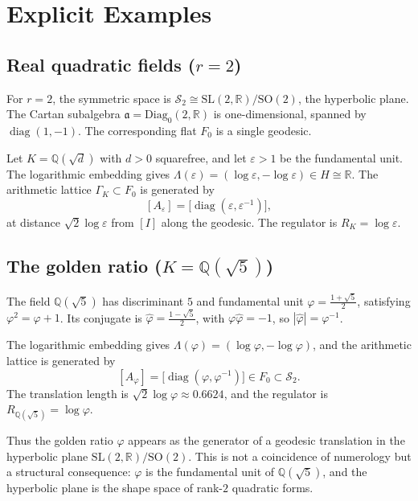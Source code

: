 \documentclass[12pt]{article}
\theoremstyle{definition}
\theoremstyle{remark}
\newcommand{\R}{\mathbb{R}}
\newcommand{\Q}{\mathbb{Q}}
\newcommand{\SL}{\mathrm{SL}}
\newcommand{\SO}{\mathrm{SO}}
\newcommand{\Diagz}{\mathrm{Diag}_{0}}
\newcommand{\calM}{\mathcal{S}}
\newcommand{\diag}{\operatorname{diag}}
\begin{document}
\section{Explicit Examples}
\label{sec:examples}

\subsection{Real quadratic fields ($r = 2$)}

For $r = 2$, the symmetric space is $\calM_2 \cong \SL(2,\R)/\SO(2)$,
the hyperbolic plane.
The Cartan subalgebra $\mathfrak{a} = \Diagz(2,\R)$ is one-dimensional,
spanned by $\diag(1,-1)$.
The corresponding flat $F_0$ is a single geodesic.

Let $K = \Q(\sqrt{d})$ with $d > 0$ squarefree, and let
$\varepsilon > 1$ be the fundamental unit.
The logarithmic embedding gives
$\Lambda(\varepsilon) = (\log\varepsilon, -\log\varepsilon) \in H \cong \R$.
The arithmetic lattice $\Gamma_K \subset F_0$ is generated by
\[
  [A_\varepsilon] = \bigl[\diag(\varepsilon, \varepsilon^{-1})\bigr],
\]
at distance $\sqrt{2}\log\varepsilon$ from $[I]$ along the geodesic.
The regulator is $R_K = \log\varepsilon$.

\subsection{The golden ratio ($K = \Q(\sqrt{5})$)}

The field $\Q(\sqrt{5})$ has discriminant $5$ and fundamental unit
$\varphi = \frac{1+\sqrt{5}}{2}$, satisfying $\varphi^2 = \varphi + 1$.
Its conjugate is $\hat\varphi = \frac{1-\sqrt{5}}{2}$, with
$\varphi\hat\varphi = -1$, so $|\hat\varphi| = \varphi^{-1}$.

The logarithmic embedding gives
$\Lambda(\varphi) = (\log\varphi, -\log\varphi)$,
and the arithmetic lattice is generated by
\[
  [A_\varphi] = \bigl[\diag(\varphi, \varphi^{-1})\bigr]
  \in F_0 \subset \calM_2.
\]
The translation length is $\sqrt{2}\log\varphi \approx 0.6624$,
and the regulator is $R_{\Q(\sqrt{5})} = \log\varphi$.

Thus the golden ratio $\varphi$ appears as the generator of a geodesic
translation in the hyperbolic plane $\SL(2,\R)/\SO(2)$.
This is not a coincidence of numerology but a structural consequence:
$\varphi$ is the fundamental unit of $\Q(\sqrt{5})$, and the
hyperbolic plane is the shape space of rank-$2$ quadratic forms.
\end{document}
